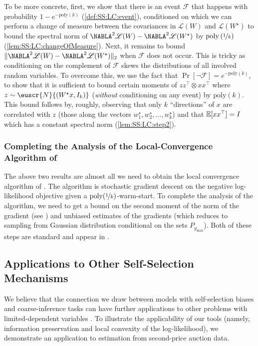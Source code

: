 \documentclass[11pt,letterpaper]{article}
\theoremstyle{plain}
\theoremstyle{definition}
\theoremstyle{remark}
\newcommand{\inparen}[1]{\ensuremath{\left(#1\right)}}
\newcommand{\snorm}[1]{\ensuremath{\ensuremath{\| #1 \|}}}
\newcommand{\evF}{\ensuremath{\mathscr{F}}}
\newcommand{\E}{\operatornamewithlimits{\mathbb{E}}}
\newcommand{\Ex}{\E}
\newcommand{\nfrac}[2]{\nicefrac{#1}{#2}}
\newcommand{\poly}{\mathrm{poly}}
\newcommand*{\Nabla}{\boldsymbol\NABLA}
\let\nabla\Nabla
\newcommand{\customcal}[1]{\euscr{#1}}
\newcommand{\cL}{\customcal{L}}
\newcommand{\cN}{\customcal{N}}
\newcommand{\negLL}{\ensuremath{\mathscr{L}}}
\newcommand{\normal}[2]{\cN{\inparen{#1,#2}}}
\newcommand{\Wstar}{{W^\star}}
\renewcommand{\cL}{\negLL}
\begin{document}
To be more concrete, first, we show that there is an event $\evF$ that happens with probability $1-e^{-\poly(k)}$ (\cref{def:SS:LC:event}), conditioned on which we can perform a change of measure between the covariances in $\cL(W)$ and $\cL(\Wstar)$ to bound the spectral norm of $\nabla^2 \cL(W) - \nabla^2 \cL(W^\star)$ by $\poly\inparen{\nfrac{1}{k}}$ (\cref{lem:SS:LC:changeOfMeasure}).
Next, it remains to bound $\snorm{\nabla^2 \cL(W) - \nabla^2 \cL(W^\star)}_2$ when $\evF$ does not occur.
This is tricky as conditioning on the complement of $\evF$ skews the distributions of all involved random variables.
To overcome this, we use the fact that $\Pr[\lnot\evF]=e^{-\poly(k)}$, to show that it is sufficient to bound certain moments of $zz^\top \otimes xx^\top$ {where $z\sim \normal{W^\star x}{I_k}$} (\textit{without} conditioning on any event) by $\poly(k)$.
This bound follows by, roughly, observing that only $k$ ``directions'' of $x$ are correlated with $z$ (those along the vectors $w^\star_1,w^\star_2,\dots,w^\star_k$) 
and that $\Ex[xx^\top]=I$ which has a constant spectral norm (\cref{lem:SS:LC:step2}).


\subsubsection*{{Completing the Analysis of the Local-Convergence} Algorithm of } The above two results are almost all we need to obtain the local convergence algorithm of . The algorithm is stochastic gradient descent on the negative log-likelihood objective given a $\poly(\nfrac{1}{k})$-warm-start. To complete the analysis of the algorithm, we need to get a bound on the second moment of the norm of the gradient (see ) and unbiased estimates of the gradients (which reduces to sampling from Gaussian distribution conditional on the sets $P_{y_{\max}}$). Both of these steps are standard and appear in .





    


\subsection{Applications to Other Self-Selection Mechanisms}
\label{sec:apps}
    We believe that the connection we draw between models with self-selection biases and coarse-inference tasks can have further applications to other problems with limited-dependent variables \cite{maddala1986limited}. 
    To {illustrate} the applicability of our tools (namely, information preservation and local convexity of {the log-}likelihood), we {demonstrate} an application to estimation {from second-price auction data}.
\end{document}
